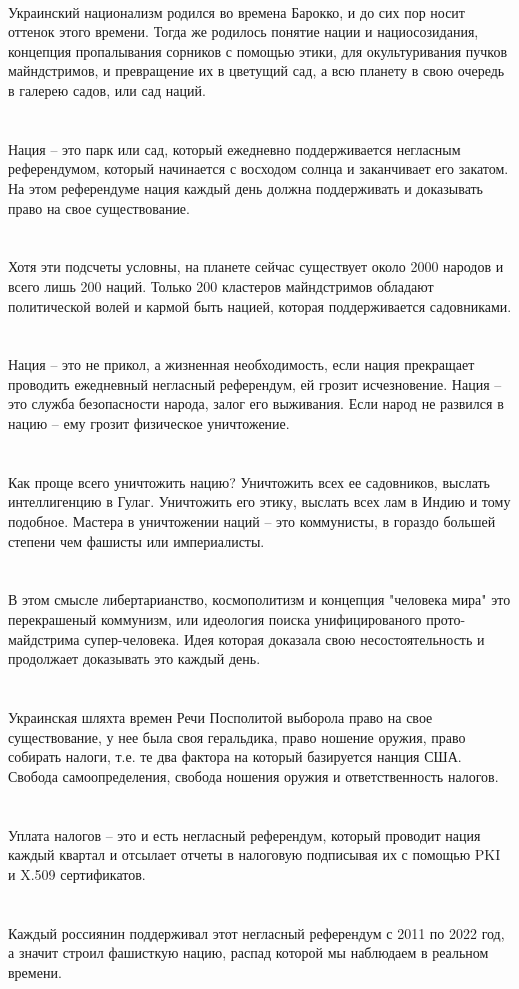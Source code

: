 \\
Украинский национализм родился во времена Барокко, и до сих пор носит оттенок этого времени. Тогда же родилось понятие нации и нациосозидания, концепция пропалывания сорников с помощью этики, для окультуривания пучков майндстримов, и превращение их в цветущий сад, а всю планету в свою очередь в галерею садов, или сад наций.\\
\\
\\
Нация -- это парк или сад, который ежедневно поддерживается негласным референдумом, который начинается с восходом солнца и заканчивает его закатом. На этом референдуме нация каждый день должна поддерживать и доказывать право на свое существование.\\
\\
\\
Хотя эти подсчеты условны, на планете сейчас существует около 2000 народов и всего лишь 200 наций. Только 200 кластеров майндстримов обладают политической волей и кармой быть нацией, которая поддерживается садовниками.\\
\\
\\
Нация -- это не прикол, а жизненная необходимость, если нация прекращает проводить ежедневный негласный референдум, ей грозит исчезновение. Нация -- это служба безопасности народа, залог его выживания. Если народ не развился в нацию -- ему грозит физическое уничтожение.\\
\\
\\
Как проще всего уничтожить нацию? Уничтожить всех ее садовников, выслать интеллигенцию в Гулаг. Уничтожить его этику, выслать всех лам в Индию и тому подобное. Мастера в уничтожении наций -- это коммунисты, в гораздо большей степени чем фашисты или империалисты.\\
\\
\\
В этом смысле либертарианство, космополитизм и концепция "человека мира" это перекрашеный коммунизм, или идеология поиска унифицированого прото-майдстрима супер-человека. Идея которая доказала свою несостоятельность и продолжает доказывать это каждый день.\\
\\
\\
Украинская шляхта времен Речи Посполитой выборола право на свое существование, у нее была своя геральдика, право ношение оружия, право собирать налоги, т.е. те два фактора на который базируется нанция США. Свобода самоопределения, свобода ношения оружия и ответственность налогов.\\
\\
\\
Уплата налогов -- это и есть негласный референдум, который проводит нация каждый квартал и отсылает отчеты в налоговую подписывая их с помощью PKI и X.509 сертификатов.\\
\\
\\
Каждый россиянин поддерживал этот негласный референдум с 2011 по 2022 год, а значит строил фашисткую нацию, распад которой мы наблюдаем в реальном времени.\\

